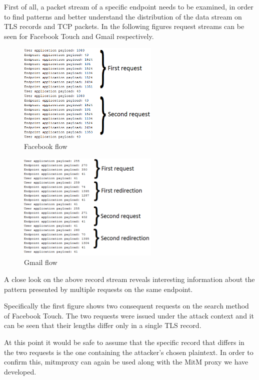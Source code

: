 First of all, a packet stream of a specific endpoint needs to be examined, in
order to find patterns and better understand the distribution of the data stream
on TLS records and TCP packets. In the following figures request streams can be
seen for Facebook Touch and Gmail respectively.

\begin{figure}[H] \caption{Facebook flow} \centering
\includegraphics[width=0.6\textwidth]{diagrams/facebook_request_flow.png}\end{figure}

\begin{figure}[H] \caption{Gmail flow} \centering
\includegraphics[width=0.6\textwidth]{diagrams/gmail_request_flow.png}\end{figure}

A close look on the above record stream reveals interesting information about
the pattern presented by multiple requests on the same endpoint.

Specifically the first figure shows two consequent requests on the search
method of Facebook Touch. The two requests were issued under the attack context
and it can be seen that their lengths differ only in a single TLS record.

At this point it would be safe to assume that the specific record that differs
in the two requests is the one containing the attacker's chosen plaintext. In
order to confirm this, mitmproxy can again be used along with the MitM proxy we
have developed.

